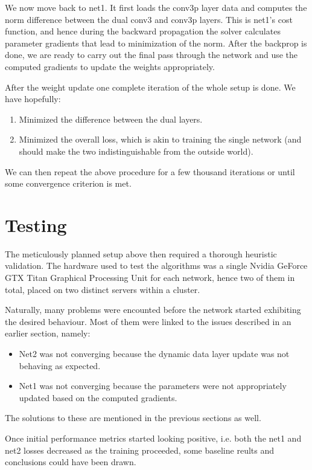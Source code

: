 \documentclass[a4paper, 11pt]{article}
\numberwithin{equation}{section}
\begin{document}
	We now move back to net1. It first loads the conv3p layer data and computes the norm difference between the dual conv3 and conv3p layers. This is net1's cost function, and hence during the backward propagation the solver calculates parameter gradients that lead to minimization of the norm. After the backprop is done, we are ready to carry out the final pass through the network and use the computed gradients to update the weights appropriately.
	
	After the weight update one complete iteration of the whole setup is done. We have hopefully:
	
	\begin{enumerate}
		\item Minimized the difference between the dual layers.
		\item Minimized the overall loss, which is akin to training the single network (and should make the two indistinguishable from the outside world).
	\end{enumerate}
	
	We can then repeat the above procedure for a few thousand iterations or until some convergence criterion is met.
	
	\section{Testing}
	
	The meticulously planned setup above then required a thorough heuristic validation. The hardware used to test the algorithms was a single Nvidia GeForce GTX Titan Graphical Processing Unit for each network, hence two of them in total, placed on two distinct servers within a cluster.
	
	Naturally, many problems were encounted before the network started exhibiting the desired behaviour. Most of them were linked to the issues described in an earlier section, namely:
	
	\begin{itemize}
		\item Net2 was not converging because the dynamic data layer update was not behaving as expected.
		\item Net1 was not converging because the parameters were not appropriately updated based on the computed gradients.
	\end{itemize}
	
	The solutions to these are mentioned in the previous sections as well.
	
	Once initial performance metrics started looking positive, i.e. both the net1 and net2 losses decreased as the training proceeded, some baseline reults and conclusions could have been drawn.
	
\end{document}
